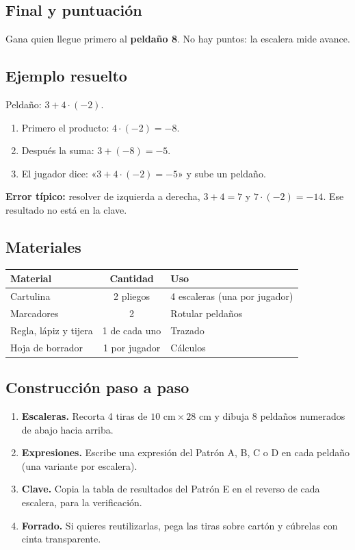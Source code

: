 \documentclass[12pt, letterpaper]{article}
\begin{document}
\subsection{Final y puntuación}

Gana quien llegue primero al \textbf{peldaño 8}. No hay puntos: la escalera mide avance.

\subsection{Ejemplo resuelto}

Peldaño: $3+4\cdot(-2)$.

\begin{cuadrosolucion}
\begin{enumerate}[leftmargin=*]
  \item Primero el producto: $4\cdot(-2)=-8$.
  \item Después la suma: $3+(-8)=-5$.
  \item El jugador dice: «$3+4\cdot(-2)=-5$» y sube un peldaño.
\end{enumerate}
\textbf{Error típico:} resolver de izquierda a derecha, $3+4=7$ y $7\cdot(-2)=-14$. Ese resultado no está en la clave.
\end{cuadrosolucion}

\subsection{Materiales}

\begin{center}
\small
\begin{tabular}{@{}p{5.0cm} c p{7.4cm}@{}}
\toprule
\textbf{Material} & \textbf{Cantidad} & \textbf{Uso}\\
\midrule
Cartulina & 2 pliegos & 4 escaleras (una por jugador)\\
Marcadores & 2 & Rotular peldaños\\
Regla, lápiz y tijera & 1 de cada uno & Trazado\\
Hoja de borrador & 1 por jugador & Cálculos\\
\bottomrule
\end{tabular}
\end{center}

\subsection{Construcción paso a paso}

\begin{enumerate}[leftmargin=*]
  \item \textbf{Escaleras.} Recorta 4 tiras de $10\text{ cm}\times 28\text{ cm}$ y dibuja 8 peldaños numerados de abajo hacia arriba.
  \item \textbf{Expresiones.} Escribe una expresión del Patrón A, B, C o D en cada peldaño (una variante por escalera).
  \item \textbf{Clave.} Copia la tabla de resultados del Patrón E en el reverso de cada escalera, para la verificación.
  \item \textbf{Forrado.} Si quieres reutilizarlas, pega las tiras sobre cartón y cúbrelas con cinta transparente.
\end{enumerate}
\end{document}
